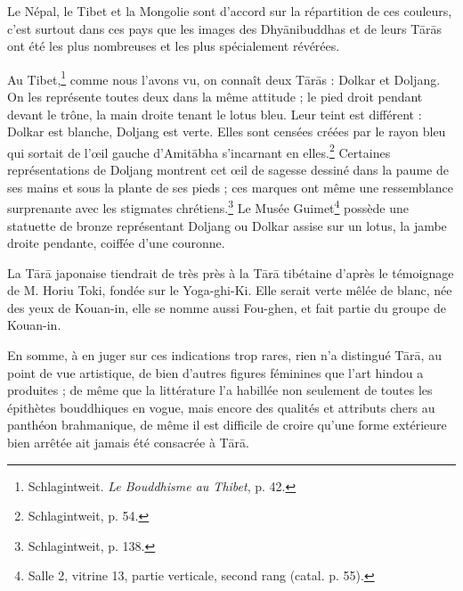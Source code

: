 \documentclass[a4paper, 11pt, oneside, french, landscape, twocolumn]{article}
\begin{document}
Le Népal, le Tibet et la Mongolie sont d'accord sur la répartition de ces couleurs, c'est surtout dans ces pays que les images des Dhy\={a}nibuddhas et de leurs T\={a}r\={a}s ont été les plus nombreuses et les plus spécialement révérées.

Au Tibet,\footnote{Schlagintweit. \emph{Le Bouddhisme au Thibet}, p. 42.} comme nous l'avons vu, on connaît deux T\={a}r\={a}s : Dolkar et Doljang. On les représente toutes deux dans la même attitude ; le pied droit pendant devant le trône, la main droite tenant le lotus bleu. Leur teint est différent : Dolkar est blanche, Doljang est verte. Elles sont censées créées par le rayon bleu qui sortait de l'œil gauche d'Amit\={a}bha s'incarnant en elles.\footnote{Schlagintweit, p. 54.} Certaines représentations de Doljang montrent cet œil de sagesse dessiné dans la paume de ses mains et sous la plante de ses pieds ; ces marques ont même une ressemblance surprenante avec les stigmates chrétiens.\footnote{Schlagintweit, p. 138.} Le Musée Guimet\footnote{Salle 2, vitrine 13, partie verticale, second rang (catal. p. 55).} possède une statuette de bronze représentant Doljang ou Dolkar assise sur un lotus, la jambe droite pendante, coiffée d'une couronne.

La T\={a}r\={a} japonaise tiendrait de très près à la T\={a}r\={a} tibétaine d'après le témoignage de M. Horiu Toki, fondée sur le Yoga-ghi-Ki. Elle serait verte mêlée de blanc, née des yeux de Kouan-in, elle se nomme aussi Fou-ghen, et fait partie du groupe de Kouan-in.

En somme, à en juger sur ces indications trop rares, rien n'a distingué T\={a}r\={a}, au point de vue artistique, de bien d'autres figures féminines que l'art hindou a produites ; de même que la littérature l'a habillée non seulement de toutes les épithètes bouddhiques en vogue, mais encore des qualités et attributs chers au panthéon brahmanique, de même il est difficile de croire qu'une forme extérieure bien arrêtée ait jamais été consacrée à T\={a}r\={a}.
\end{document}
